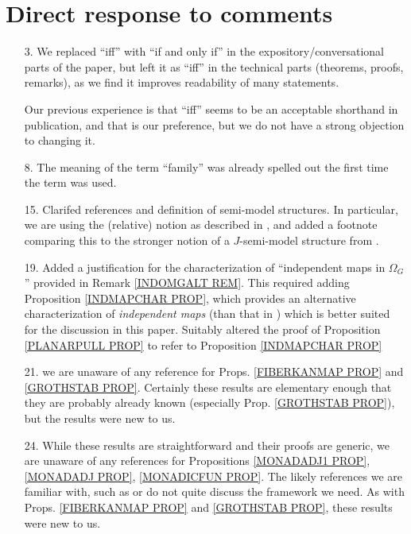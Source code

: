 \documentclass{article}
\begin{document}
\section{Direct response to comments}

\begin{itemize}
	\item[3.] We replaced ``iff'' with ``if and only if''
	in the expository/conversational parts of the paper, 
	but left it as ``iff'' in the technical parts (theorems, proofs, remarks), as we find it improves readability of many statements.
	
	Our previous experience is that ``iff'' seems to be an acceptable shorthand in publication, and that is our preference,
	but we do not have a strong objection to changing it.
	
	\item[8.] The meaning of the term ``family''
              was already spelled out the first time the term was used.

        \item[15.] Clarifed references and definition of semi-model structures. In particular, we are using the (relative) notion as described in \cite{WY15}, and added a footnote comparing this to the stronger notion of a $J$-semi-model structure from \cite{Spi01}.

	\item[19.] Added a justification for 
	the characterization of ``independent maps in $\Omega_G$''
	provided in Remark \ref{INDOMGALT REM}.
	This required adding 
	Proposition \ref{INDMAPCHAR PROP},
	which provides an alternative characterization of \emph{independent maps}
	(than that in \cite[Def. 5.28]{Pe17})
	which is better suited for the discussion in this paper.
	Suitably altered the proof of Proposition \ref{PLANARPULL PROP}
	to refer to Proposition \ref{INDMAPCHAR PROP}
	
	\item[21.] we are unaware of any reference for Props. 
	\ref{FIBERKANMAP PROP} and \ref{GROTHSTAB PROP}.
	Certainly these results are elementary enough that they are probably already known (especially Prop. \ref{GROTHSTAB PROP}),
	but the results were new to us. 
	
	\item[24.] While these results are straightforward 
	and their proofs are generic, 
	we are unaware of any references for Propositions \ref{MONADADJ1 PROP}, \ref{MONADADJ PROP}, \ref{MONADICFUN PROP}. The likely references we are familiar with, such as 
	\cite{Bo94} or \cite{Ri17} do not quite discuss the framework we need.
	As with Props. 
	\ref{FIBERKANMAP PROP} and \ref{GROTHSTAB PROP},
	these results were new to us.
	

\end{itemize}
\end{document}
